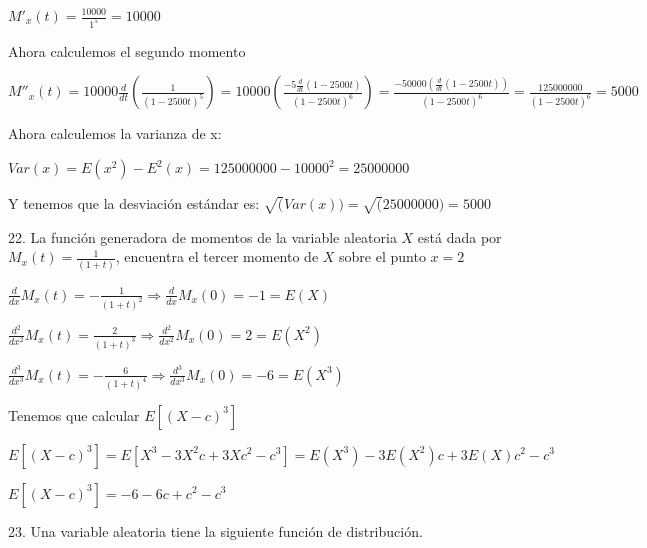 \documentclass{article}
\begin{document}
        $M'_x(t) = \frac{10000}{1^5}= 10000$\vspace{.1cm}

        Ahora calculemos el segundo momento\vspace{.1cm}

        $M''_x(t) = 10000 \frac{d}{dt}(\frac{1}{(1-2500t)^5}) = 
        10000 (\frac{-5\frac{d}{dt}(1-2500t)}{(1-2500t)^6}) = 
        \frac{-50000(\frac{d}{dt}(1-2500t))}{(1-2500t)^6} = 
        \frac{125000000}{(1-2500t)^6} = 5000$ \vspace{.1cm}

        Ahora calculemos la varianza de x: \vspace{.1cm}

        $Var(x) = E(x^2) - E^2(x) = 125000000 - 10000^2 = 25000000$\vspace{.1cm}

        Y tenemos que la desviación estándar es: $\displaystyle\sqrt(Var(x)) 
        = \displaystyle\sqrt(25000000) = 5000$\vspace{.3cm}

        22. La función generadora de momentos de la variable 
        aleatoria $X$ está dada por $M_x(t)=\frac{1}{(1+t)}$, 
        encuentra el tercer momento de $X$ sobre el punto $x=2$
        \vspace{.1cm}

        \vspace{.1cm}

        $\frac{d}{dx}M_x(t)=-\frac{1}{(1+t)^2} \Rightarrow \frac{d}{dx}M_x(0)=-1=E(X)$\vspace{.1cm}

        $\frac{d^2}{dx^2}M_x(t)=\frac{2}{(1+t)^3} \Rightarrow \frac{d^2}{dx^2}M_x(0)=2=E(X^2)$\vspace{.1cm}

        $\frac{d^3}{dx^3}M_x(t)=-\frac{6}{(1+t)^4} \Rightarrow \frac{d^3}{dx^3}M_x(0)=-6 = E(X^3)$\vspace{.1cm}

        Tenemos que calcular $E[(X-c)^3]$\vspace{.1cm}

        $E[(X-c)^3]=E[X^3-3X^2c+3Xc^2-c^3]=E(X^3)-3E(X^2)c+3E(X)c^2-c^3$\vspace{.1cm}

        $E[(X-c)^3]=-6-6c+c^2-c^3$

        23. Una variable aleatoria tiene la siguiente función de 
        distribución.\vspace{.1cm}
\end{document}
